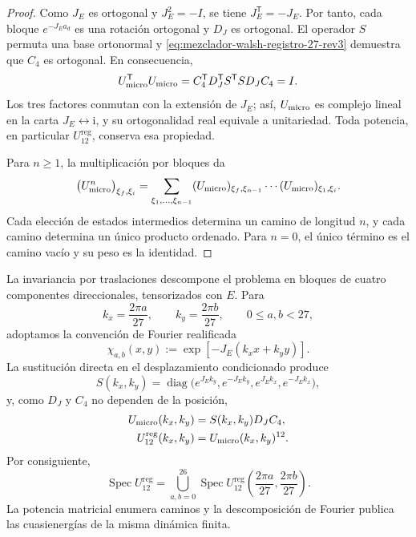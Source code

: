 \begin{proof}
Como \(J_E\) es ortogonal y \(J_E^2=-I\), se tiene
\(J_E^{\mathsf T}=-J_E\). Por tanto, cada bloque
\(e^{-J_Ea_d}\) es una rotación ortogonal y \(D_J\) es ortogonal.
El operador \(S\) permuta una base ortonormal y
\eqref{eq:mezclador-walsh-registro-27-rev3} demuestra que \(C_4\) es
ortogonal. En consecuencia,
\[
 U_{\rm micro}^{\mathsf T}U_{\rm micro}
 =C_4^{\mathsf T}D_J^{\mathsf T}S^{\mathsf T}
   S D_JC_4
 =I.
\]
Los tres factores conmutan con la extensión de \(J_E\); así,
\(U_{\rm micro}\) es complejo lineal en la carta
\(J_E\leftrightarrow\mathrm i\), y su ortogonalidad real equivale a
unitariedad. Toda potencia, en particular
\(U_{12}^{\mathrm{reg}}\), conserva esa propiedad.

Para \(n\geq1\), la multiplicación por bloques da
\[
 \bigl(U_{\rm micro}^{n}\bigr)_{\xi_f,\xi_i}
 =
 \sum_{\xi_1,\ldots,\xi_{n-1}}
 (U_{\rm micro})_{\xi_f,\xi_{n-1}}
 \cdots
 (U_{\rm micro})_{\xi_1,\xi_i}.
\]
Cada elección de estados intermedios determina un camino de longitud \(n\),
y cada camino determina un único producto ordenado. Para \(n=0\), el único
término es el camino vacío y su peso es la identidad.
\end{proof}

La invariancia por traslaciones descompone el problema en bloques de cuatro
componentes direccionales, tensorizados con \(E\). Para
\[
 k_x=\frac{2\pi a}{27},
 \qquad
 k_y=\frac{2\pi b}{27},
 \qquad 0\leq a,b<27,
\]
adoptamos la convención de Fourier realificada
\[
 \chi_{a,b}(x,y)
 :=\exp[-J_E(k_xx+k_yy)].
\]
La sustitución directa en el desplazamiento condicionado produce
\[
 S(k_x,k_y)
 =\operatorname{diag}
 \bigl(
  e^{J_Ek_y},e^{-J_Ek_y},
  e^{J_Ek_x},e^{-J_Ek_x}
 \bigr),
\]
y, como \(D_J\) y \(C_4\) no dependen de la posición,
\begin{equation}
 \begin{aligned}
 U_{\rm micro}(k_x,k_y)
   &=S(k_x,k_y)D_JC_4,\\
 U_{12}^{\mathrm{reg}}(k_x,k_y)
   &=U_{\rm micro}(k_x,k_y)^{12}.
 \end{aligned}
 \label{eq:bloques-fourier-registro-27-rev3}
\end{equation}
Por consiguiente,
\[
 \operatorname{Spec}U_{12}^{\mathrm{reg}}
 =
 \bigcup_{a,b=0}^{26}
 \operatorname{Spec}
 U_{12}^{\mathrm{reg}}
 \left(\frac{2\pi a}{27},\frac{2\pi b}{27}\right).
\]
La potencia matricial enumera caminos y la descomposición de Fourier publica
las cuasienergías de la misma dinámica finita.

